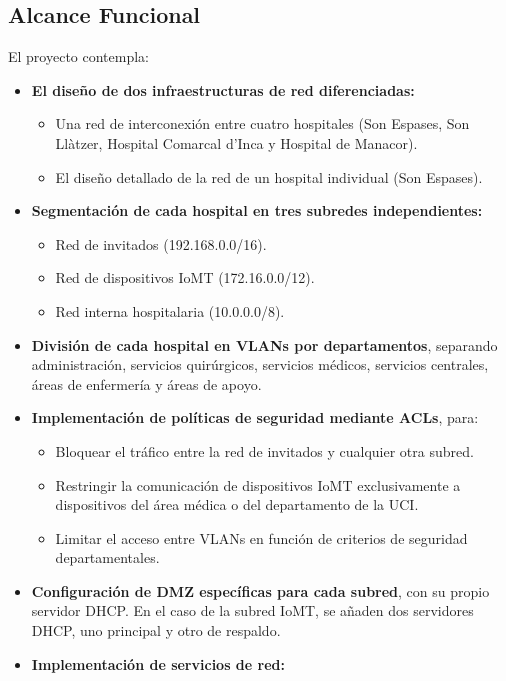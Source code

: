 \subsection{Alcance Funcional}
El proyecto contempla:
\begin{itemize}
    \item \textbf{El diseño de dos infraestructuras de red diferenciadas:}
    \begin{itemize}
        \item Una red de interconexión entre cuatro hospitales (Son Espases, Son Llàtzer, Hospital Comarcal d'Inca y Hospital de Manacor).
        \item El diseño detallado de la red de un hospital individual (Son Espases).
    \end{itemize}
    \item \textbf{Segmentación de cada hospital en tres subredes independientes:}
    \begin{itemize}
        \item Red de invitados (192.168.0.0/16).
        \item Red de dispositivos \acs{IoMT} (172.16.0.0/12).
        \item Red interna hospitalaria (10.0.0.0/8).
    \end{itemize}
    \item \textbf{División de cada hospital en VLANs por departamentos}, separando administración, servicios quirúrgicos, servicios médicos, servicios centrales, áreas de enfermería y 
    áreas de apoyo.
    \item \textbf{Implementación de políticas de seguridad mediante ACLs}, para:
    \begin{itemize}
        \item Bloquear el tráfico entre la red de invitados y cualquier otra subred.
        \item Restringir la comunicación de dispositivos IoMT exclusivamente a dispositivos del área médica o del departamento de la \ac{UCI}.
        \item Limitar el acceso entre VLANs en función de criterios de seguridad departamentales.
    \end{itemize}
    \item \textbf{Configuración de \ac{DMZ} específicas para cada subred}, con su propio servidor \ac{DHCP}. En el caso de la subred IoMT, se añaden dos servidores DHCP, uno principal y 
    otro de respaldo.
    \item \textbf{Implementación de servicios de red:}

\end{itemize}
